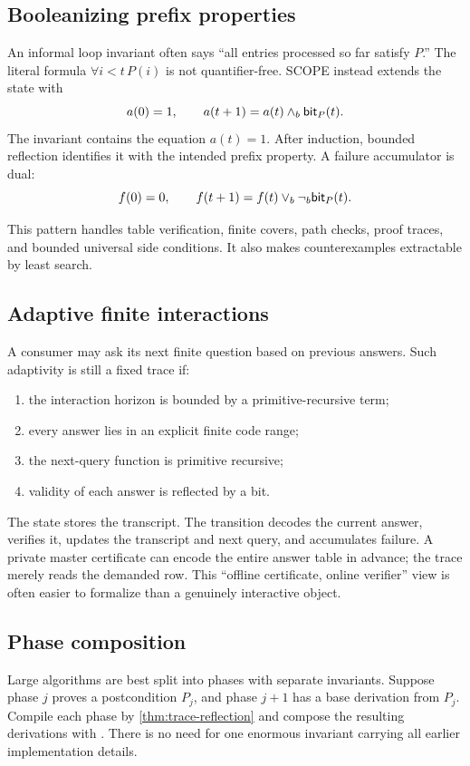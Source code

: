 \subsection{Booleanizing prefix properties}

An informal loop invariant often says ``all entries processed so far satisfy \(P\).''  The literal formula \(\forall i<t\,P(i)\) is not quantifier-free.  SCOPE instead extends the state with
\[
  a(0)=1,
  \qquad
  a(t+1)=a(t)\wedge_b \mathsf{bit}_P(t).
\]
The invariant contains the equation \(a(t)=1\).  After induction, bounded reflection identifies it with the intended prefix property.  A failure accumulator is dual:
\[
  f(0)=0,
  \qquad
  f(t+1)=f(t)\vee_b\neg_b\mathsf{bit}_P(t).
\]

This pattern handles table verification, finite covers, path checks, proof traces, and bounded universal side conditions.  It also makes counterexamples extractable by least search.

\subsection{Adaptive finite interactions}

A consumer may ask its next finite question based on previous answers.  Such adaptivity is still a fixed trace if:

\begin{enumerate}
\item the interaction horizon is bounded by a primitive-recursive term;
\item every answer lies in an explicit finite code range;
\item the next-query function is primitive recursive;
\item validity of each answer is reflected by a bit.
\end{enumerate}

The state stores the transcript.  The transition decodes the current answer, verifies it, updates the transcript and next query, and accumulates failure.  A private master certificate can encode the entire answer table in advance; the trace merely reads the demanded row.  This ``offline certificate, online verifier'' view is often easier to formalize than a genuinely interactive object.

\subsection{Phase composition}

Large algorithms are best split into phases with separate invariants.  Suppose phase \(j\) proves a postcondition \(P_j\), and phase \(j+1\) has a base derivation from \(P_j\).  Compile each phase by \cref{thm:trace-reflection} and compose the resulting derivations with .  There is no need for one enormous invariant carrying all earlier implementation details.

